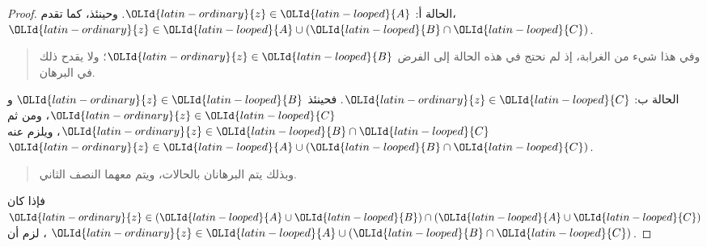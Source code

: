 \documentclass[../../../include/open-logic-section]{subfiles}
\begin{document}
\begin{proof}
الحالة أ: $\OLId{latin-ordinary}{z} \in \OLId{latin-looped}{A}$. وحينئذ، كما تقدم،
$\OLId{latin-ordinary}{z} \in \OLId{latin-looped}{A} \cup (\OLId{latin-looped}{B} \cap \OLId{latin-looped}{C})$.
\begin{quote}
وفي هذا شيء من الغرابة، إذ لم نحتج في هذه الحالة إلى الفرض
$\OLId{latin-ordinary}{z} \in \OLId{latin-looped}{B}$؛ ولا يقدح ذلك في البرهان.
\end{quote}
الحالة ب: $\OLId{latin-ordinary}{z} \in \OLId{latin-looped}{C}$. فحينئذ $\OLId{latin-ordinary}{z} \in \OLId{latin-looped}{B}$ و$\OLId{latin-ordinary}{z} \in \OLId{latin-looped}{C}$، ومن ثم
$\OLId{latin-ordinary}{z} \in \OLId{latin-looped}{B} \cap \OLId{latin-looped}{C}$، ويلزم عنه $\OLId{latin-ordinary}{z} \in \OLId{latin-looped}{A} \cup (\OLId{latin-looped}{B} \cap \OLId{latin-looped}{C})$.
\begin{quote}
وبذلك يتم البرهانان بالحالات، ويتم معهما النصف الثاني.
\end{quote}
فإذا كان $\OLId{latin-ordinary}{z} \in (\OLId{latin-looped}{A} \cup \OLId{latin-looped}{B}) \cap (\OLId{latin-looped}{A} \cup \OLId{latin-looped}{C})$، لزم أن
$\OLId{latin-ordinary}{z} \in \OLId{latin-looped}{A} \cup (\OLId{latin-looped}{B} \cap \OLId{latin-looped}{C})$.
\end{proof}
\end{document}
